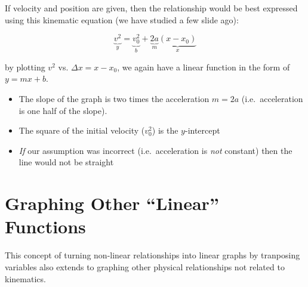 If velocity and position are given, then the relationship would be best
expressed using this kinematic equation (we have studied a few slide ago):

\begin{displaymath}
  \underbrace{v^2}_y=\underbrace{v_0^2}_b+\underbrace{2a}_m
  \underbrace{(x-x_0)}_x
\end{displaymath}

by plotting $v^2$ vs. $\Delta x=x-x_0$, we again have a linear function in the
form of $y=mx+b$.
\begin{itemize}
\item The slope of the graph is two times the acceleration $m=2a$ (i.e.\
  acceleration is one half of the slope).
\item The square of the initial velocity ($v_0^2$) is the $y$-intercept
\item \emph{If} our assumption was incorrect (i.e.\ acceleration is \emph{not}
  constant) then the line would not be straight
\end{itemize}


\section{Graphing Other ``Linear'' Functions}
This concept of turning non-linear relationships into linear graphs by
tranposing variables also extends to graphing other physical relationships not
related to kinematics.

